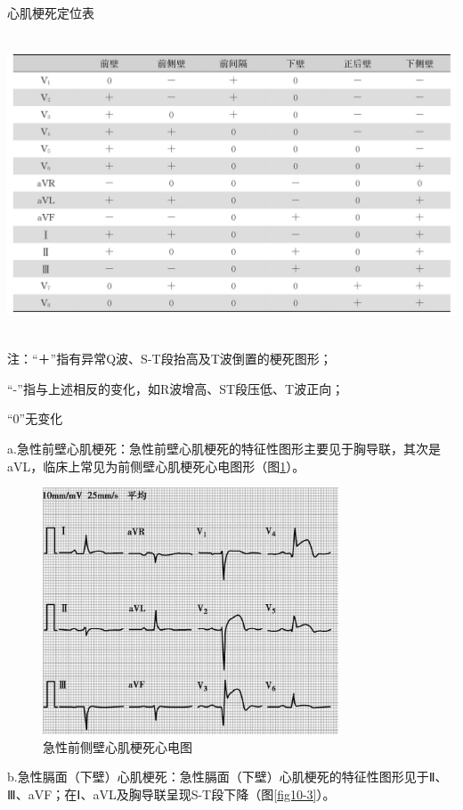 \begin{table}[htbp]
\centering
\caption{心肌梗死定位表}
\label{tab10-2}
\includegraphics[width=5.96875in,height=3.5in]{./images/Image00072.jpg}
\end{table}

注：“＋”指有异常Q波、S-T段抬高及T波倒置的梗死图形；

“-”指与上述相反的变化，如R波增高、ST段压低、T波正向；

“0”无变化

a.急性前壁心肌梗死：急性前壁心肌梗死的特征性图形主要见于胸导联，其次是aVL，临床上常见为前侧壁心肌梗死心电图形（图\ref{fig10-2}）。

\begin{figure}[!htbp]
 \centering
 \includegraphics[width=3.45833in,height=2.88542in]{./images/Image00073.jpg}
 \captionsetup{justification=centering}
 \caption{急性前侧壁心肌梗死心电图}
 \label{fig10-2}
  \end{figure} 

b.急性膈面（下壁）心肌梗死：急性膈面（下壁）心肌梗死的特征性图形见于Ⅱ、Ⅲ、aVF；在Ⅰ、aVL及胸导联呈现S-T段下降（图\ref{fig10-3}）。

